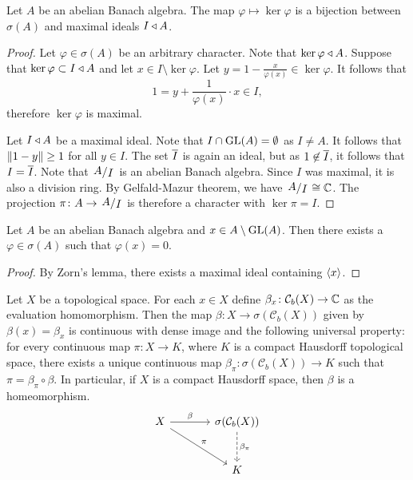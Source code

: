 \begin{trditev}
Let $A$ be an abelian Banach algebra. The map
$\varphi \mapsto \ker \varphi$ is a bijection between $\sigma(A)$
and maximal ideals $I \triangleleft A$.
\end{trditev}

\begin{proof}
Let $\varphi \in \sigma(A)$ be an arbitrary character. Note that
$\ker \varphi \triangleleft A$. Suppose that
$\ker \varphi \subset I \triangleleft A$ and let
$x \in I \setminus \ker \varphi$. Let
$y = 1 - \frac{x}{\varphi(x)} \in \ker \varphi$. It follows that
\[
1 = y + \frac{1}{\varphi(x)} \cdot x \in I,
\]
therefore $\ker \varphi$ is maximal.

Let $I \triangleleft A$ be a maximal ideal. Note that
$I \cap \operatorname{GL}(A) = \emptyset$ as $I \ne A$. It follows that
$\left\lVert 1 - y\right\rVert \geq 1$ for all $y \in I$. The set $\overline{I}$ is
again an ideal, but as $1 \not \in \overline{I}$, it follows that
$I = \overline{I}$. Note that $\kvoc{A}{I}$ is an abelian Banach
algebra. Since $I$ was maximal, it is also a division ring. By
Gelfald-Mazur theorem, we have $\kvoc{A}{I} \cong \C$. The
projection $\pi \colon A \to \kvoc{A}{I}$ is therefore a character
with $\ker \pi = I$.
\end{proof}

\begin{posledica}
\label{Cstar:ps:ann}
Let $A$ be an abelian Banach algebra and
$x \in A \setminus \operatorname{GL}(A)$. Then there exists a
$\varphi \in \sigma(A)$ such that $\varphi(x) = 0$.
\end{posledica}

\begin{proof}
By Zorn's lemma, there exists a maximal ideal containing $\left\langle x\right\rangle$.
\end{proof}

\begin{izrek}
Let $X$ be a topological space. For each $x \in X$ define
$\beta_x \colon \mathcal{C}_b(X) \to \mathbb{C}$ as the evaluation
homomorphism. Then the map
$\beta \colon X \to \sigma(\mathcal{C}_b(X))$ given by
$\beta(x) = \beta_x$ is continuous with dense image and the
following universal property: for every continuous map
$\pi \colon X \to K$, where $K$ is a compact Hausdorff topological
space, there exists a unique continuous map
$\beta_\pi \colon \sigma(\mathcal{C}_b(X)) \to K$ such that
$\pi = \beta_\pi \circ \beta$. In particular, if $X$ is a compact
Hausdorff space, then $\beta$ is a homeomorphism.
\[
\begin{tikzcd}[column sep=large, row sep=large]
X \arrow[r, "\beta"] \arrow[dr, "\pi"] &
\sigma(\mathcal{C}_b(X)) \arrow[d, dashed, "\beta_\pi"] \\
&
K
\end{tikzcd}
\]
\end{izrek}

